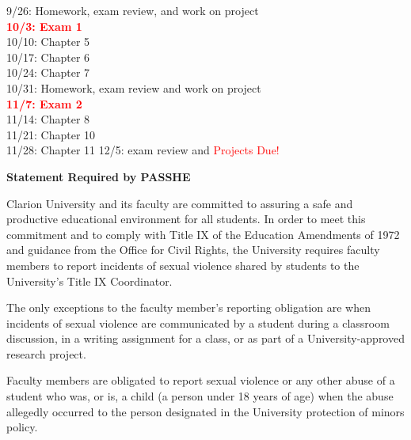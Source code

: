 \documentclass{article}
\begin{document}
9/26:  Homework, exam review, and work on project \\
{\bf \textcolor{red}{10/3:  Exam 1}} \\
10/10: Chapter 5\\
10/17: Chapter 6\\
10/24:  Chapter 7\\ 
10/31:  Homework, exam review and work on project \\ 
{\bf \textcolor{red}{11/7:  Exam 2}}\\
11/14: Chapter 8\\
11/21: Chapter 10\\
11/28: Chapter 11
12/5: exam review and \textcolor{red}{Projects Due!}\\

\clearpage

\begin{center}
{\bf Statement Required by PASSHE}  
\end{center}

Clarion University and its faculty are committed to assuring a safe and productive educational environment for all students. In order to meet this commitment and to comply with Title IX of the Education Amendments of 1972 and guidance from  the Office for Civil Rights, the University requires faculty members to report incidents of sexual violence shared by students to the University's Title IX Coordinator.                         

The only exceptions to the faculty member's reporting obligation are when incidents of sexual violence are communicated by a student during a classroom discussion, in a writing assignment for a class, or as part of a University-approved research project.                           

Faculty members are obligated to report sexual violence or any other abuse of a student who was, or is, a child (a person under 18 years of age) when the abuse allegedly occurred to the person designated in the University protection of minors policy. 
\end{document}
